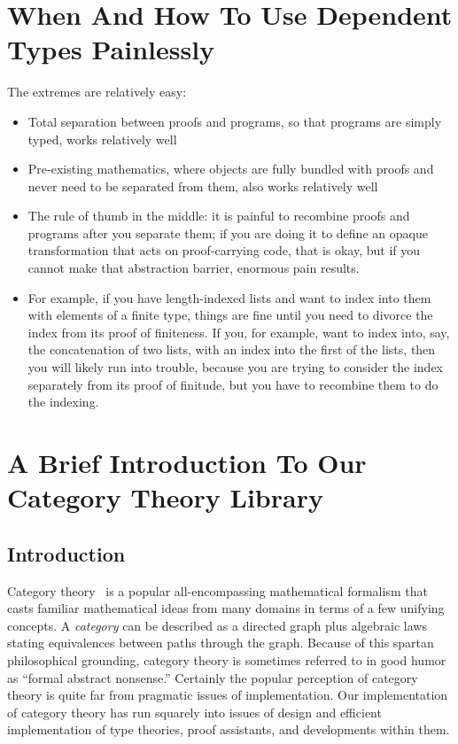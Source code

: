 \section{When And How To Use Dependent Types Painlessly}\label{sec:when-how-dependent-types}
The extremes are relatively easy:
\begin{itemize}
    \item Total separation between proofs and programs, so that programs are simply typed, works relatively well
    \item Pre-existing mathematics, where objects are fully bundled with proofs and never need to be separated from them, also works relatively well
    \item The rule of thumb in the middle: it is painful to recombine proofs and programs after you separate them; if you are doing it to define an opaque transformation that acts on proof-carrying code, that is okay, but if you cannot make that abstraction barrier, enormous pain results.
    \item For example, if you have length-indexed lists and want to index into them with elements of a finite type, things are fine until you need to divorce the index from its proof of finiteness.  If you, for example, want to index into, say, the concatenation of two lists, with an index into the first of the lists, then you will likely run into trouble, because you are trying to consider the index separately from its proof of finitude, but you have to recombine them to do the indexing.
\end{itemize}

\section{A Brief Introduction To Our Category Theory Library}\label{sec:category-theory-library}
\subsection{Introduction}
Category theory~\cite{mac1998categories} is a popular all-encompassing mathematical formalism that casts familiar mathematical ideas from many domains in terms of a few unifying concepts.
A \emph{category} can be described as a directed graph plus algebraic laws stating equivalences between paths through the graph.
Because of this spartan philosophical grounding, category theory is sometimes referred to in good humor as ``formal abstract nonsense.''
Certainly the popular perception of category theory is quite far from pragmatic issues of implementation.
Our implementation of category theory has run squarely into issues of design and efficient implementation of type theories, proof assistants, and developments within them.

